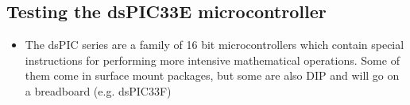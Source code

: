 \documentclass{article}
\begin{document}

\subsection{Testing the dsPIC33E microcontroller}

\begin{itemize}
  \item The dsPIC series are a family of 16 bit microcontrollers which contain special instructions for performing more intensive mathematical operations. Some of them come in surface mount packages, but some are also DIP and will go on a breadboard (e.g. dsPIC33F)
\end{itemize}
\end{document}
